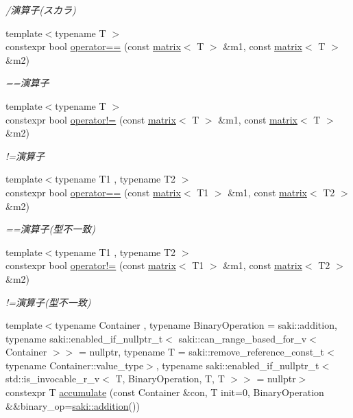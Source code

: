 \begin{DoxyCompactItemize}
\begin{DoxyCompactList}\small\item\em /演算子(スカラ) \end{DoxyCompactList}\item 
{\footnotesize template$<$typename T $>$ }\\constexpr bool \mbox{\hyperlink{namespacesaki_a67e5e15cae6e9152e0bd5ac2e1705da4}{operator==}} (const \mbox{\hyperlink{classsaki_1_1matrix}{matrix}}$<$ T $>$ \&m1, const \mbox{\hyperlink{classsaki_1_1matrix}{matrix}}$<$ T $>$ \&m2)
\begin{DoxyCompactList}\small\item\em ==演算子 \end{DoxyCompactList}\item 
{\footnotesize template$<$typename T $>$ }\\constexpr bool \mbox{\hyperlink{namespacesaki_a76722addb100e11d9eb9370ced3b027c}{operator!=}} (const \mbox{\hyperlink{classsaki_1_1matrix}{matrix}}$<$ T $>$ \&m1, const \mbox{\hyperlink{classsaki_1_1matrix}{matrix}}$<$ T $>$ \&m2)
\begin{DoxyCompactList}\small\item\em !=演算子 \end{DoxyCompactList}\item 
{\footnotesize template$<$typename T1 , typename T2 $>$ }\\constexpr bool \mbox{\hyperlink{namespacesaki_a1ffbf8122dda5209dc384e64747bec32}{operator==}} (const \mbox{\hyperlink{classsaki_1_1matrix}{matrix}}$<$ T1 $>$ \&m1, const \mbox{\hyperlink{classsaki_1_1matrix}{matrix}}$<$ T2 $>$ \&m2)
\begin{DoxyCompactList}\small\item\em ==演算子(型不一致) \end{DoxyCompactList}\item 
{\footnotesize template$<$typename T1 , typename T2 $>$ }\\constexpr bool \mbox{\hyperlink{namespacesaki_a4bef07cf55a40a115c89e6e20406b124}{operator!=}} (const \mbox{\hyperlink{classsaki_1_1matrix}{matrix}}$<$ T1 $>$ \&m1, const \mbox{\hyperlink{classsaki_1_1matrix}{matrix}}$<$ T2 $>$ \&m2)
\begin{DoxyCompactList}\small\item\em !=演算子(型不一致) \end{DoxyCompactList}\item 
{\footnotesize template$<$typename Container , typename Binary\+Operation  = saki\+::addition, typename saki\+::enabled\+\_\+if\+\_\+nullptr\+\_\+t$<$ saki\+::can\+\_\+range\+\_\+based\+\_\+for\+\_\+v$<$ Container $>$$>$  = nullptr, typename T  = saki\+::remove\+\_\+reference\+\_\+const\+\_\+t$<$typename Container\+::value\+\_\+type$>$, typename saki\+::enabled\+\_\+if\+\_\+nullptr\+\_\+t$<$ std\+::is\+\_\+invocable\+\_\+r\+\_\+v$<$ T, Binary\+Operation, T, T $>$$>$  = nullptr$>$ }\\constexpr T \mbox{\hyperlink{namespacesaki_aeb83577f2e85117be5645c0cb499a1fc}{accumulate}} (const Container \&con, T init=0, Binary\+Operation \&\&binary\+\_\+op=\mbox{\hyperlink{structsaki_1_1addition}{saki\+::addition}}())

\end{DoxyCompactItemize}
